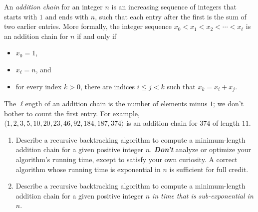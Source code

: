 \begin{exercises}
\item An \textit{addition chain} for an integer $n$ is an increasing sequence of integers that starts with $1$ and ends with $n$, such that each entry after the first is the sum of two earlier entries.
More formally, the integer sequence $x_0 < x_1 < x_2 < \cdots < x_\ell$ is an addition chain for $n$ if and only if
\begin{itemize}
\item $x_0 = 1$,
\item $x_\ell = n$, and
\item for every index $k > 0$, there are indices $i \le j < k$ such that $x_k = x_i + x_j$.
\end{itemize}
The $\ell$ength of an addition chain is the number of elements minus $1$; we don’t bother to count the first entry.
For example, $\langle 1, 2, 3, 5, 10, 20, 23, 46, 92, 184, 187, 374\rangle$ is an addition chain for $374$ of length $11$.
\begin{enumerate}
\item Describe a recursive backtracking algorithm to compute a minimum-length addition chain for a given positive integer $n$.
\textbf{\textit{Don’t}} analyze or optimize your algorithm’s running time, except to satisfy your own curiosity.
A correct algorithm whose running time is exponential in $n$ is sufficient for full credit.
\item {} Describe a recursive backtracking algorithm to compute a minimum-length addition chain for a given positive integer $n$ \textit{in time that is sub-exponential in} $n$.
\end{enumerate}


\end{exercises}
